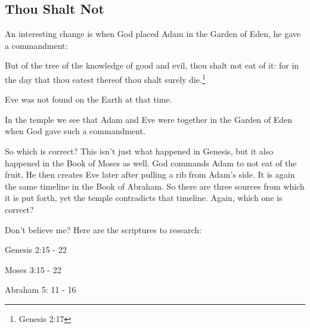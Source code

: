 \subsection{Thou Shalt Not}

An interesting change is when God placed Adam in the Garden of Eden, he gave a
commandment:

\begin{displayquote}
But of the tree of the knowledge of good and evil, thou shalt not eat of it: 
for in the day that thou eatest thereof thou shalt surely 
die.\footnote{Genesis 2:17}
\end{displayquote}

Eve was not found on the Earth at that time.

In the temple we see that Adam and Eve were together in the Garden of Eden when
God gave such a commandment.

So which is correct? This isn't just what happened in Genesis, but it also
happened in the Book of Moses as well. God commands Adam to not eat of the
fruit, He then creates Eve later after pulling a rib from Adam's side. It is
again the same timeline in the Book of Abraham. So there are three sources from
which it is put forth, yet the temple contradicts that timeline. Again, which
one is correct?

Don't believe me? Here are the scriptures to research:

\begin{displayquote}
Genesis 2:15 - 22

Moses 3:15 - 22

Abraham 5: 11 - 16
\end{displayquote}